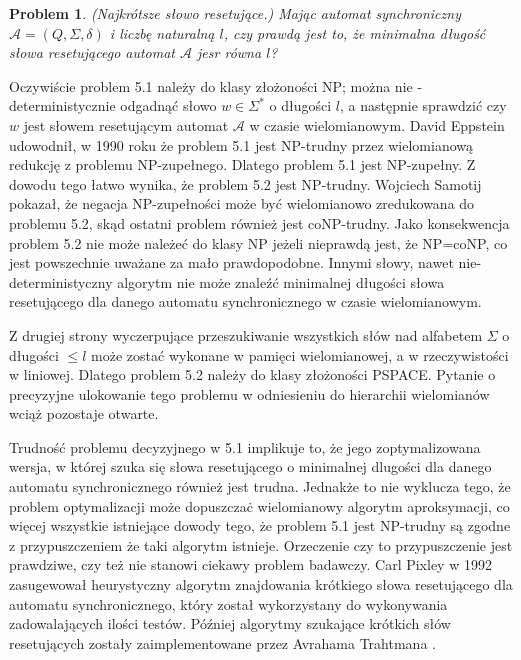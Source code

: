 \documentclass[12pt,a4paper]{article}
\newtheorem{pro}{Problem}[section]
\begin{document}
\begin{pro} (Najkr\'otsze s{\l}owo resetuj\k{a}ce.) Maj\k{a}c automat synchroniczny  $\mathscr{A}=(Q, \Sigma, \delta)$ i liczb\k{e} naturaln\k{a} $l$, czy prawd\k{a} jest to, \.ze minimalna  d{\l}ugo\'s\'c s{\l}owa resetuj\k{a}cego automat $\mathscr{A}$ jesr r\'owna $l$?
\end{pro}

Oczywi\'scie problem 5.1 nale\.zy do klasy z{\l}o\.zono\'sci NP; mo\.zna nie -deterministycznie odgadn\k{a}\'c s{\l}owo $w\in\Sigma^{*}$ o d{\l}ugo\'sci $l$, a nast\k{e}pnie sprawdzi\'c czy $w$ jest s{\l}owem resetuj\k{a}cym automat $\mathscr{A}$ w czasie wielomianowym. David Eppstein udowodni{\l}, w 1990 roku \.ze problem 5.1 jest NP-trudny przez wielomianow\k{a} redukcj\k{e} z problemu NP-zupe{\l}nego. Dlatego problem 5.1 jest NP-zupe{\l}ny. Z dowodu tego {\l}atwo wynika, \.ze problem 5.2 jest NP-trudny. Wojciech Samotij \cite{1} pokaza{\l}, \.ze negacja NP-zupe{\l}no\'sci mo\.ze by\'c wielomianowo zredukowana do problemu 5.2, sk\k{a}d ostatni problem r\'ownie\.z jest coNP-trudny. Jako konsekwencja problem 5.2 nie mo\.ze nale\.ze\'c do klasy NP je\.zeli nieprawd\k{a} jest, \.ze NP=coNP, co jest powszechnie uwa\.zane za ma{\l}o prawdopodobne. Innymi s{\l}owy, nawet nie-deterministyczny algorytm nie mo\.ze znale\'z\'c minimalnej d{\l}ugo\'sci s{\l}owa resetuj\k{a}cego dla danego automatu synchronicznego w czasie wielomianowym.

Z drugiej strony wyczerpuj\k{a}ce przeszukiwanie wszystkich s{\l}\'ow nad alfabetem $\Sigma$ o d{\l}ugo\'sci $\leq l$ mo\.ze zosta\'c wykonane w pami\k{e}ci wielomianowej, a w rzeczywisto\'sci w liniowej. Dlatego problem 5.2 nale\.zy do klasy z{\l}o\.zono\'sci PSPACE. Pytanie o precyzyjne ulokowanie tego problemu w odniesieniu do hierarchii wielomian\'ow wci\k{a}\.z pozostaje otwarte. 

Trudno\'s\'c problemu decyzyjnego w 5.1 implikuje to, \.ze jego zoptymalizowana wersja, w kt\'orej szuka si\k{e} s{\l}owa resetuj\k{a}cego o minimalnej d{l}ugo\'sci dla danego automatu synchronicznego r\'ownie\.z jest trudna. Jednak\.ze to nie wyklucza tego, \.ze problem optymalizacji mo\.ze dopuszcza\.c wielomianowy algorytm aproksymacji, co wi\k{e}cej wszystkie istniej\k{a}ce dowody tego, \.ze problem 5.1 jest NP-trudny s\k{a} zgodne z  przypuszczeniem \.ze taki algorytm istnieje. Orzeczenie czy to przypuszczenie jest prawdziwe, czy te\.z nie stanowi ciekawy problem badawczy. Carl Pixley \cite{2} w 1992 zasugewowa{\l} heurystyczny algorytm znajdowania kr\'otkiego s{\l}owa resetuj\k{a}cego dla automatu synchronicznego, kt\'ory zosta{\l} wykorzystany do wykonywania zadowalaj\k{a}cych ilo\'sci test\'ow. P\'o\'zniej algorytmy szukaj\k{a}ce kr\'otkich s{\l}\'ow resetuj\k{a}cych zosta{\l}y zaimplementowane przez Avrahama Trahtmana \cite{3}.
\end{document}
